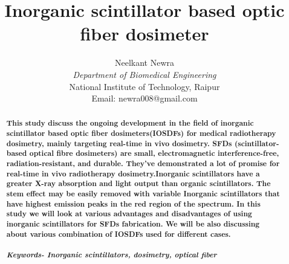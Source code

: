 \documentclass{article}
\title{\textbf{Inorganic scintillator based optic fiber dosimeter}}
\author{Neelkant Newra\\
\textit{Department of Biomedical Engineering} \\ National Institute of Technology, Raipur \\ Email: newra008@gmail.com\\}
\date{}
\begin{document}
\maketitle
\begin{abstract}\textbf{This study discuss the ongoing development in the field of inorganic scintillator based optic fiber dosimeters(IOSDFs) for medical radiotherapy dosimetry, mainly targeting real-time in vivo dosimetry. SFDs (scintillator-based optical fibre dosimeters) are small, electromagnetic interference-free, radiation-resistant, and durable. They've demonstrated a lot of promise for real-time in vivo radiotherapy dosimetry.Inorganic scintillators have a greater X-ray absorption and light output than organic scintillators. The stem effect may be easily removed with variable Inorganic scintillators  that have highest emission peaks in the red region of the spectrum. In this study we will look at various advantages and disadvantages of using inorganic scintillators for SFDs fabrication. We will be also discussing about various combination of IOSDFs used for different cases. } \\ \\
    \textbf{\textit{Keywords- Inorganic scintillators, dosimetry, optical fiber}} 
\end{abstract}
\end{document}
